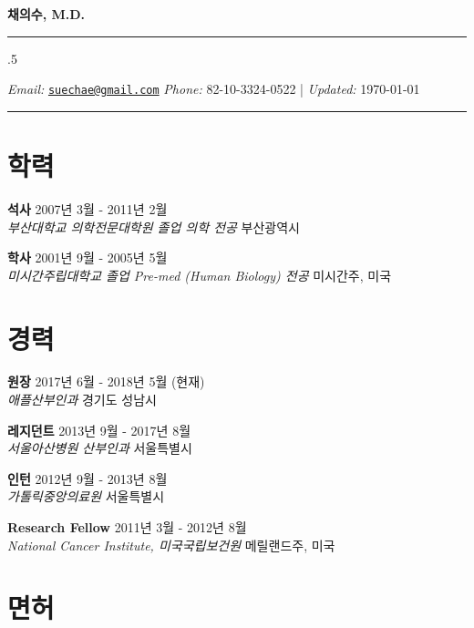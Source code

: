 \documentclass[12pt,]{article}
\begin{document}
\centerline{\huge \bf 채의수, M.D.}

\vspace{2 mm}

\hrule

\vspace{2 mm}



\moveleft.5\hoffset\centerline{ \emph{Email:} \href{mailto:}{\href{mailto:suechae@gmail.com}{\nolinkurl{suechae@gmail.com}}} \hspace{1 mm} \emph{Phone:}  82-10-3324-0522  \hspace{1 mm}       | \emph{Updated:} \today}

\vspace{2 mm}

\hrule


\section{학력}

\textbf{석사} \hfill 2007년 3월 - 2011년 2월\\
\emph{부산대학교 의학전문대학원 졸업 \textbar{} 의학 전공}
\hfill 부산광역시

\textbf{학사} \hfill 2001년 9월 - 2005년 5월\\
\emph{미시간주립대학교 졸업 \textbar{} Pre-med (Human Biology) 전공}
\hfill 미시간주, 미국

\section{경력}

\textbf{원장} \hfill 2017년 6월 - 2018년 5월 (현재)\\
\emph{애플산부인과} \hfill 경기도 성남시

\textbf{레지던트} \hfill 2013년 9월 - 2017년 8월\\
\emph{서울아산병원 산부인과} \hfill 서울특별시

\textbf{인턴} \hfill 2012년 9월 - 2013년 8월\\
\emph{가톨릭중앙의료원} \hfill 서울특별시

\textbf{Research Fellow} \hfill 2011년 3월 - 2012년 8월\\
\emph{National Cancer Institute, 미국국립보건원} \hfill 메릴랜드주, 미국

\section{면허}
\end{document}
